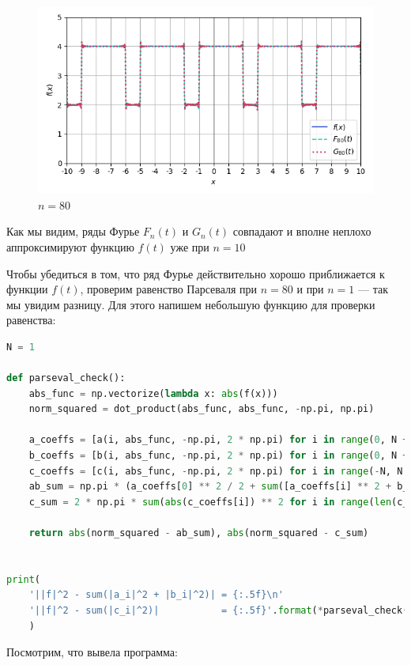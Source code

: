 \documentclass[a4paper]{article}
\begin{document}
\begin{figure}[H]
    \centering
    \includegraphics[width=0.7\linewidth]{square_wave/Im80.png}
    \caption{$n = 80$}
\end{figure}

Как мы видим, ряды Фурье $F_n(t)$ и $G_n(t)$ совпадают и вполне неплохо аппроксимируют функцию $f(t)$ уже при $n = 10$

Чтобы убедиться в том, что ряд Фурье действительно хорошо приближается к функции $f(t)$, проверим равенство Парсеваля при $n=80$ и при $n = 1$ --- так мы увидим разницу. Для этого напишем небольшую функцию для проверки равенства:

\begin{lstlisting}[language=Python, caption=Проверка равенства Парсеваля]
N = 1

def parseval_check():
    abs_func = np.vectorize(lambda x: abs(f(x)))
    norm_squared = dot_product(abs_func, abs_func, -np.pi, np.pi)
    
    a_coeffs = [a(i, abs_func, -np.pi, 2 * np.pi) for i in range(0, N + 1)]
    b_coeffs = [b(i, abs_func, -np.pi, 2 * np.pi) for i in range(0, N + 1)]
    c_coeffs = [c(i, abs_func, -np.pi, 2 * np.pi) for i in range(-N, N + 1)]
    ab_sum = np.pi * (a_coeffs[0] ** 2 / 2 + sum([a_coeffs[i] ** 2 + b_coeffs[i] ** 2 for i in range(1, N + 1)]))
    c_sum = 2 * np.pi * sum(abs(c_coeffs[i]) ** 2 for i in range(len(c_coeffs)))
    
    return abs(norm_squared - ab_sum), abs(norm_squared - c_sum)   


print(
    '||f|^2 - sum(|a_i|^2 + |b_i|^2)| = {:.5f}\n'
    '||f|^2 - sum(|c_i|^2)|           = {:.5f}'.format(*parseval_check())
    )
\end{lstlisting}
Посмотрим, что вывела программа: 
\end{document}
